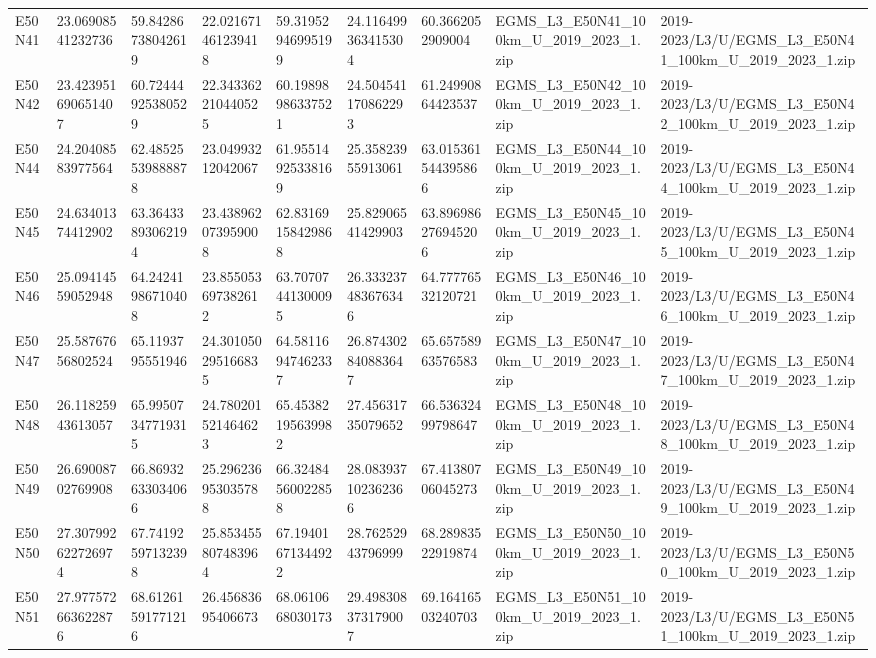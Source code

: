 \begin{landscape}
\begin{longtable}{lllllllll}
E50N41 & 23.06908541232736 & 59.84286738042619 & 22.021671461239418 & 59.31952946995199 & 24.116499363415304 & 60.3662052909004 & EGMS\_L3\_E50N41\_100km\_U\_2019\_2023\_1.zip & 2019-2023/L3/U/EGMS\_L3\_E50N41\_100km\_U\_2019\_2023\_1.zip \\
E50N42 & 23.423951690651407 & 60.72444925380529 & 22.343362210440525 & 60.19898986337521 & 24.504541170862293 & 61.24990864423537 & EGMS\_L3\_E50N42\_100km\_U\_2019\_2023\_1.zip & 2019-2023/L3/U/EGMS\_L3\_E50N42\_100km\_U\_2019\_2023\_1.zip \\
E50N44 & 24.20408583977564 & 62.48525539888878 & 23.04993212042067 & 61.95514925338169 & 25.35823955913061 & 63.015361544395866 & EGMS\_L3\_E50N44\_100km\_U\_2019\_2023\_1.zip & 2019-2023/L3/U/EGMS\_L3\_E50N44\_100km\_U\_2019\_2023\_1.zip \\
E50N45 & 24.63401374412902 & 63.36433893062194 & 23.438962073959008 & 62.83169158429868 & 25.82906541429903 & 63.896986276945206 & EGMS\_L3\_E50N45\_100km\_U\_2019\_2023\_1.zip & 2019-2023/L3/U/EGMS\_L3\_E50N45\_100km\_U\_2019\_2023\_1.zip \\
E50N46 & 25.09414559052948 & 64.24241986710408 & 23.855053697382612 & 63.70707441300095 & 26.333237483676346 & 64.77776532120721 & EGMS\_L3\_E50N46\_100km\_U\_2019\_2023\_1.zip & 2019-2023/L3/U/EGMS\_L3\_E50N46\_100km\_U\_2019\_2023\_1.zip \\
E50N47 & 25.58767656802524 & 65.1193795551946 & 24.301050295166835 & 64.58116947462337 & 26.874302840883647 & 65.65758963576583 & EGMS\_L3\_E50N47\_100km\_U\_2019\_2023\_1.zip & 2019-2023/L3/U/EGMS\_L3\_E50N47\_100km\_U\_2019\_2023\_1.zip \\
E50N48 & 26.11825943613057 & 65.99507347719315 & 24.780201521464623 & 65.45382195639982 & 27.45631735079652 & 66.53632499798647 & EGMS\_L3\_E50N48\_100km\_U\_2019\_2023\_1.zip & 2019-2023/L3/U/EGMS\_L3\_E50N48\_100km\_U\_2019\_2023\_1.zip \\
E50N49 & 26.69008702769908 & 66.86932633034066 & 25.296236953035788 & 66.32484560022858 & 28.083937102362366 & 67.41380706045273 & EGMS\_L3\_E50N49\_100km\_U\_2019\_2023\_1.zip & 2019-2023/L3/U/EGMS\_L3\_E50N49\_100km\_U\_2019\_2023\_1.zip \\
E50N50 & 27.307992622726974 & 67.74192597132398 & 25.853455807483964 & 67.19401671344922 & 28.76252943796999 & 68.28983522919874 & EGMS\_L3\_E50N50\_100km\_U\_2019\_2023\_1.zip & 2019-2023/L3/U/EGMS\_L3\_E50N50\_100km\_U\_2019\_2023\_1.zip \\
E50N51 & 27.977572663622876 & 68.61261591771216 & 26.45683695406673 & 68.0610668030173 & 29.498308373179007 & 69.16416503240703 & EGMS\_L3\_E50N51\_100km\_U\_2019\_2023\_1.zip & 2019-2023/L3/U/EGMS\_L3\_E50N51\_100km\_U\_2019\_2023\_1.zip \\

\end{longtable}
\end{landscape}

